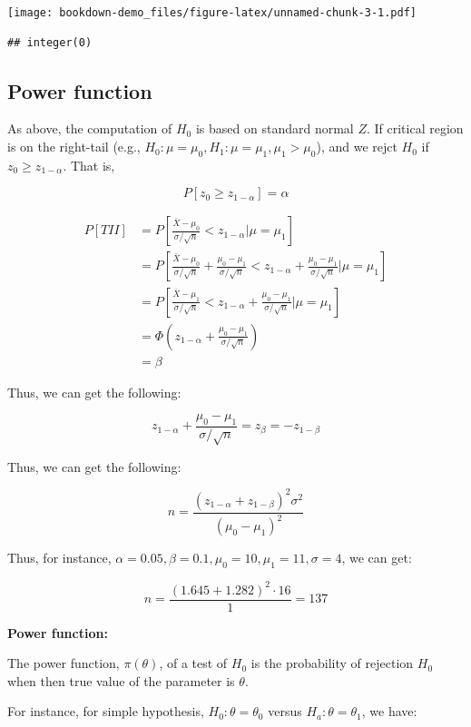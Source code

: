 \documentclass[]{book}
\begin{document}
\texttt{[image: bookdown-demo\_files/figure-latex/unnamed-chunk-3-1.pdf]}

\begin{verbatim}
## integer(0)
\end{verbatim}

\hypertarget{power-function}{%
\subsection{Power function}\label{power-function}}

As above, the computation of \(H_0\) is based on standard normal \(Z\). If critical region is on the right-tail (e.g., \(H_0:\mu=\mu_0, H_1: \mu=\mu_1, \mu_1>\mu_0\)), and we rejct \(H_0\) if \(z_0 \geq z_{1-\alpha}\). That is,

\[P[z_0 \geq z_{1-\alpha}]=\alpha\]

\[\begin{aligned} P[TII] &=P[\frac{\bar{X}-\mu_0}{\sigma/\sqrt{n}} < z_{1-\alpha} |\mu=\mu_1] \\ &=P[\frac{\bar{X}-\mu_0}{\sigma/\sqrt{n}}+\frac{\mu_0-\mu_1}{\sigma/\sqrt{n}} < z_{1-\alpha} +\frac{\mu_0-\mu_1}{\sigma/\sqrt{n}}|\mu=\mu_1]  \\ &=P[\frac{\bar{X}-\mu_1}{\sigma/\sqrt{n}}< z_{1-\alpha} +\frac{\mu_0-\mu_1}{\sigma/\sqrt{n}}|\mu=\mu_1] \\ &=\Phi(z_{1-\alpha} +\frac{\mu_0-\mu_1}{\sigma/\sqrt{n}}) \\ &=\beta \end{aligned}\]

Thus, we can get the following:

\[z_{1-\alpha} +\frac{\mu_0-\mu_1}{\sigma/\sqrt{n}}=z_{\beta}=-z_{1-\beta}\]

Thus, we can get the following:

\[n=\frac{(z_{1-\alpha}+z_{1-\beta})^2\sigma^2}{(\mu_0-\mu_1)^2}\]

Thus, for instance, \(\alpha=0.05, \beta=0.1, \mu_0=10, \mu_1=11, \sigma=4\), we can get:

\[n=\frac{(1.645+1.282)^2 \cdot 16}{1}=137\]

\textbf{Power function:}

The power function, \(\pi(\theta)\), of a test of \(H_0\) is the probability of rejection \(H_0\) when then true value of the parameter is \(\theta\).

For instance, for simple hypothesis, \(H_0:\theta=\theta_0\) versus \(H_a:\theta=\theta_1\), we have:
\end{document}

